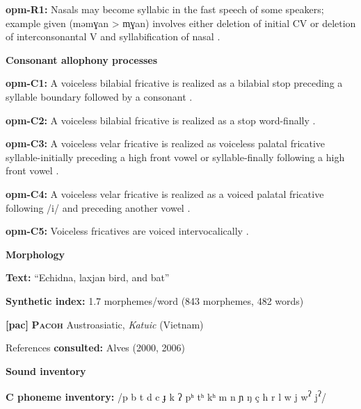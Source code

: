 \textbf{opm-R1:} Nasals may become syllabic in the fast speech of some speakers; example given (məmɣan > m̩ɣan) involves either deletion of initial CV or deletion of interconsonantal V and syllabification of nasal \citep[64]{Loughnane2009}.



\textbf{Consonant allophony processes}



\textbf{opm-C1:} A voiceless bilabial fricative is realized as a bilabial stop preceding a syllable boundary followed by a consonant \citep[33]{Loughnane2009}.



\textbf{opm-C2:} A voiceless bilabial fricative is realized as a stop word-finally \citep[33]{Loughnane2009}.



\textbf{opm-C3:} A voiceless velar fricative is realized as voiceless palatal fricative syllable-initially preceding a high front vowel or syllable-finally following a high front vowel \citep[42]{Loughnane2009}.



\textbf{opm-C4:} A voiceless velar fricative is realized as a voiced palatal fricative following /i/ and preceding another vowel \citep[42]{Loughnane2009}.



\textbf{opm-C5:} Voiceless fricatives are voiced intervocalically \citep[42]{Loughnane2009}.



\textbf{Morphology}



\textbf{Text:} “Echidna, laxjan bird, and bat” \citep[493-502]{Loughnane2009}



\textbf{Synthetic index:} 1.7 morphemes/word (843 morphemes, 482 words)



\textbf{[pac]}   \textbf{\textsc{Pacoh}}  Austroasiatic, \textit{Katuic} (Vietnam)



References \textbf{consulted:} Alves (2000, 2006)



\textbf{Sound inventory}



\textbf{C phoneme inventory:} /p b t d c ɟ k ʔ pʰ tʰ kʰ m n ɲ ŋ ç h r l w j w\textsuperscript{ʔ} j\textsuperscript{ʔ}/




